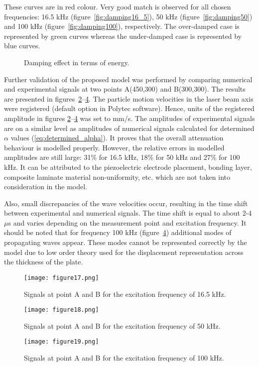 {These curves are in red colour.
Very good match is observed for all chosen frequencies: 16.5 kHz (figure~\ref{fig:damping16_5}), 50 kHz (figure~\ref{fig:damping50}) and 100 kHz (figure~\ref{fig:damping100}), respectively.
The over-damped case is represented by green curves whereas the under-damped case is represented by blue curves.
\begin{figure} [h!]
	\centering
	\hspace{0.1 cm} 	
	\hspace{0.1 cm} 	
	\caption{Damping effect in terms of energy.}
	\label{fig:damping}
\end{figure}

Further validation of the proposed model was performed by comparing numerical and experimental signals at two points A(450,300) and B(300,300).
The results are presented in figures~\ref{fig:damping_signals_16_5}--\ref{fig:damping_signals_100}.
The particle motion velocities in the laser beam axis were registered (default option in Polytec software). 
Hence, units of the registered amplitude in figures \ref{fig:damping_signals_16_5}--\ref{fig:damping_signals_100} was set to mm/s.
The amplitudes of experimental signals are on a similar level as amplitudes of numerical signals calculated for determined \(\alpha\) values (\ref{eq:determined_alpha}).
It proves that the overall attenuation behaviour is modelled properly.
However, the relative errors in modelled amplitudes are still large: 31\% for 16.5 kHz, 
18\% for 50 kHz and 27\% for 100 kHz.
It can be attributed to the piezoelectric electrode placement, bonding layer, composite laminate material non-uniformity, etc. which are not taken into consideration in the model. 

Also, small discrepancies of the wave velocities occur, resulting in the time shift between experimental and numerical signals.
The time shift is equal to about 2-4 \(\mu\)s and varies depending on the measurement point and excitation frequency.
It should be noted that for frequency 100 kHz (figure~\ref{fig:damping_signals_100}) additional modes of propagating waves appear.
These modes cannot be represented correctly by the model due to low order theory used for the displacement representation across the thickness of the plate.
\begin{figure} [h!]
	\centering
	\texttt{[image: figure17.png]}
	\caption{Signals at point A and B for the excitation frequency of 16.5 kHz.}
	\label{fig:damping_signals_16_5}
\end{figure}
\begin{figure} [h!]
	\centering
	\texttt{[image: figure18.png]}
	\caption{Signals at point A and B for the excitation frequency of 50 kHz.}
	\label{fig:damping_signals_50}
\end{figure}
\begin{figure} [h!]
	\centering
	\texttt{[image: figure19.png]}
	\caption{Signals at point A and B for the excitation frequency of 100 kHz.}
	\label{fig:damping_signals_100}
\end{figure}
}
\clearpage
